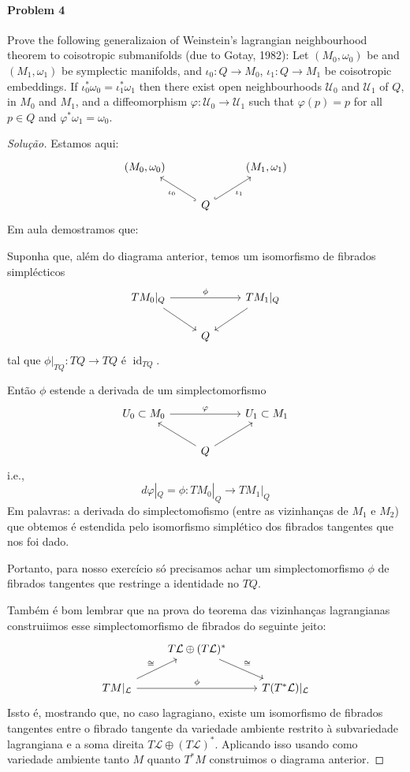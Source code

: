 \paragraph{Problem 4}Prove the following generalizaion of Weinstein's lagrangian neighbourhood theorem to coisotropic submanifolds (due to Gotay, 1982): Let $(M_0,\omega_0)$ be and $(M_1,\omega_1)$ be symplectic manifolds, and $\iota_0:Q\longrightarrow M_0$, $\iota_1:Q\longrightarrow M_1$ be coisotropic embeddings. If $\iota^*_0\omega_0=\iota_1^*\omega_1$ then there exist open  neighbourhoods $\mathcal{U}_0$ and $\mathcal{U}_1$ of $Q$, in $M_0$ and $M_1$, and a diffeomorphism $\varphi:\mathcal{U}_0\longrightarrow \mathcal{U}_1$ such that $\varphi(p)=p$ for all $p\in Q$ and $\varphi^*\omega_1=\omega_0$.

\begin{proof}[Solução]\leavevmode
	Estamos aqui:
	\[\begin{tikzcd}
		(M_0,\omega_0)&&(M_1,\omega_1)\\
	&Q\arrow[ul,"\iota_0",hook]\arrow[ur,"\iota_1",hook,swap]
	\end{tikzcd}\]
Em aula demostramos que:
\begin{thm}\leavevmode
	Suponha que, além do diagrama anterior, temos um isomorfismo de fibrados simpl\'ecticos
	\[\begin{tikzcd}
	TM_0|_{Q}\arrow[rr,"\phi"]\arrow[dr,swap]&&TM_1|_{Q}\arrow[dl]\\
	&Q
	\end{tikzcd}\]
	tal que $\phi|_{TQ}:TQ\to TQ$ é $\operatorname{id}_{TQ}$.

	Ent\~ao $\phi$ estende a derivada de um simplectomorfismo
	\[\begin{tikzcd}
	U_0\subset M_0\arrow[rr,"\varphi"]&&U_1\subset M_1\\
	&Q\arrow[ul]\arrow[ur,swap]
	\end{tikzcd}\]
	i.e.,
	\[d\varphi|_{Q}=\phi:TM_0|_{Q}\to TM_1|_{Q}\]
	Em palavras: a derivada do simplectomofismo (entre as vizinhanças de $M_1$ e $M_2$) que obtemos é estendida pelo isomorfismo simpl\'etico dos fibrados tangentes que nos foi dado.
\end{thm}
Portanto, para nosso exercício só precisamos achar um simplectomorfismo $\phi$ de fibrados tangentes que restringe a identidade no $TQ$.

Também é bom lembrar que na prova do teorema das vizinhanças lagrangianas construiimos esse simplectomorfismo de fibrados do seguinte jeito:
	\[\begin{tikzcd}
	&T\mathcal{L}\oplus (T\mathcal{L})^*\arrow[dr,"\cong "]\\
	TM|_{\mathcal{L}}\arrow[rr,"\phi"]\arrow[ur,"\cong "]&&T(T^*\mathcal{L})|_{\mathcal{L}}
	\end{tikzcd}\]
	Issto é, mostrando que, no caso lagragiano, existe um isomorfismo de fibrados tangentes entre o fibrado tangente da variedade ambiente restrito à subvariedade lagrangiana e a soma direita $T\mathcal{L}\oplus (T\mathcal{L})^*$. Aplicando isso usando como variedade ambiente tanto $M$ quanto $T^*M$ construimos o diagrama anterior.


\end{proof}
